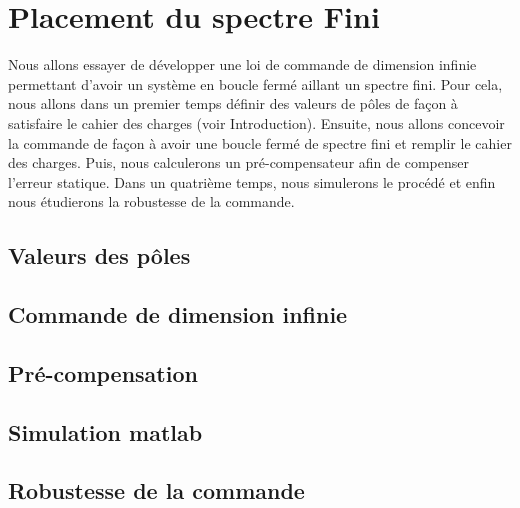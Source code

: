 \chapter{Placement du spectre Fini}
Nous allons essayer de développer une loi de commande de dimension infinie permettant d'avoir un système en boucle fermé aillant un spectre fini. Pour cela, nous allons dans un premier temps définir des valeurs de pôles de façon à satisfaire le cahier des charges (voir Introduction). Ensuite, nous allons concevoir la commande de façon à avoir une boucle fermé de spectre fini et remplir le cahier des charges. Puis, nous calculerons un pré-compensateur afin de compenser l'erreur statique. Dans un quatrième temps, nous simulerons le procédé et enfin nous étudierons la robustesse de la commande.

\section{Valeurs des pôles}

\section{Commande de dimension infinie}
\section{Pré-compensation}
\section{Simulation matlab}
\section{Robustesse de la commande}
